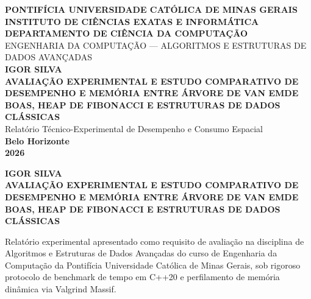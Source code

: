 \documentclass[12pt,a4paper]{report}
\begin{document}
\begin{titlepage}
  \centering
  \MakeUppercase{\textbf{Pontifícia Universidade Católica de Minas Gerais}}\\[0.2cm]
  \MakeUppercase{\textbf{Instituto de Ciências Exatas e Informática}}\\[0.2cm]
  \MakeUppercase{\textbf{Departamento de Ciência da Computação}}\\[0.2cm]
  \MakeUppercase{Engenharia da Computação --- Algoritmos e Estruturas de Dados Avançadas}\\[4.5cm]

  \MakeUppercase{\textbf{Igor Silva}}\\[4.0cm]

  \MakeUppercase{\textbf{Avaliação Experimental e Estudo Comparativo de Desempenho e Memória entre Árvore de van Emde Boas, Heap de Fibonacci e Estruturas de Dados Clássicas}}\\[0.4cm]
  \normalsize Relatório Técnico-Experimental de Desempenho e Consumo Espacial\\[4.5cm]

  \textbf{Belo Horizonte}\\[0.2cm]
  \textbf{2026}
\end{titlepage}

\thispagestyle{empty}
\begin{center}
  \MakeUppercase{\textbf{Igor Silva}}\\[4.0cm]
  \MakeUppercase{\textbf{Avaliação Experimental e Estudo Comparativo de Desempenho e Memória entre Árvore de van Emde Boas, Heap de Fibonacci e Estruturas de Dados Clássicas}}\\[2.5cm]
\end{center}

\begin{flushright}
  \begin{minipage}{0.55\textwidth}
    \small
    Relatório experimental apresentado como requisito de avaliação na disciplina de Algoritmos e Estruturas de Dados Avançadas do curso de Engenharia da Computação da Pontifícia Universidade Católica de Minas Gerais, sob rigoroso protocolo de benchmark de tempo em C++20 e perfilamento de memória dinâmica via Valgrind Massif.
  \end{minipage}
\end{flushright}
\end{document}
